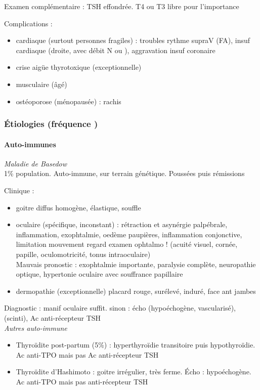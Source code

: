 \documentclass[11pt]{article}
\begin{document}
Examen complémentaire : TSH effondrée. T4 ou T3 libre pour l'importance

Complications : 
\begin{itemize}
\item cardiaque (surtout personnes fragiles) : troubles rythme supraV (FA), insuf
cardiaque (droite, avec débit N ou \inc), aggravation insuf coronaire
\item crise aigüe thyrotoxique (exceptionnelle)
\item musculaire (âgé)
\item ostéoporose (\female ménopausée) : rachis
\end{itemize}

\subsubsection{Étiologies (fréquence \dec)}
\label{sec:orgbb48a0a}
\paragraph{Auto-immunes}
\label{sec:org0b1b329}
\emph{Maladie de Basedow}\\
1\% population. Auto-immune, sur terrain génétique. Poussées puis rémissions

Clinique : 
\begin{itemize}
\item goitre diffus homogène, élastique, souffle
\item oculaire (spécifique, inconstant) : rétraction et asynérgie palpébrale,
inflammation, exophtalmie, oedème paupières, inflammation conjonctive,
limitation mouvement regard
\thus examen ophtalmo ! (acuité visuel, cornée, papille, oculomotricité, tonus
intraoculaire)\\
Mauvais pronostic : exophtalmie importante, paralysie complète, neuropathie
optique, hypertonie oculaire avec souffrance papillaire
\item dermopathie (exceptionnelle) placard rouge, surélevé, induré, face ant jambes
\end{itemize}

Diagnostic : manif oculaire suffit. sinon : écho (hypoéchogène, vascularisé),
(scinti), Ac anti-récepteur TSH\\

\emph{Autres auto-immune}
\begin{itemize}
\item Thyroïdite post-partum (5\%) : hyperthyroïdie transitoire puis hypothyroïdie. Ac
anti-TPO mais pas Ac anti-récepteur TSH
\item Thyroïdite d'Hashimoto : goitre irrégulier, très ferme. Écho :
hypoéchogène. Ac anti-TPO mais pas anti-récepteur TSH
\end{itemize}
\end{document}
